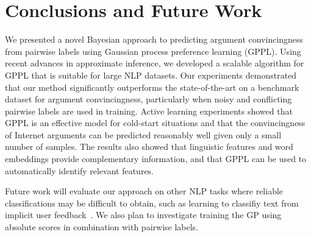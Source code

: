 \section{Conclusions and Future Work}

We presented a novel Bayesian approach to predicting argument convincingness from pairwise labels using
Gaussian process preference learning (GPPL).
Using recent advances in approximate inference, we developed a scalable algorithm for GPPL 
that is suitable for large NLP datasets.
Our experiments demonstrated that our method significantly outperforms the state-of-the-art
on a benchmark dataset for argument convincingness, 
particularly when noisy and conflicting pairwise labels are used in training.
Active learning experiments showed that GPPL is an effective model 
for cold-start situations 
and that the convincingness of Internet arguments can be predicted reasonably 
well given only a small number of samples.
The results also showed that linguistic features and word embeddings provide complementary information,
and that GPPL can be used to automatically identify relevant features.

Future work will evaluate our approach on other NLP tasks 
where reliable classifications may be difficult to obtain, 
such as learning to classifiy text from implicit user feedback~\cite{joachims2002optimizing}.
We also plan to investigate training the GP using absolute scores in combination with pairwise labels.
